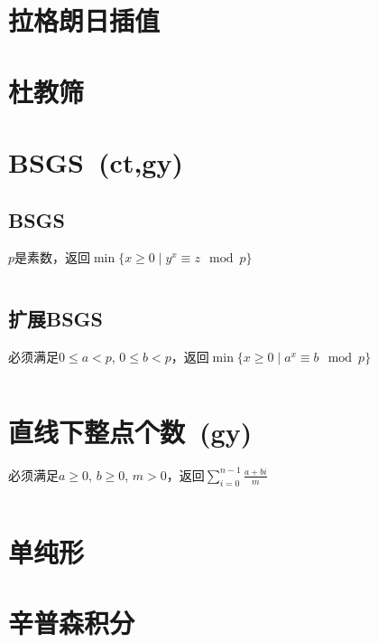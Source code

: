 \section{拉格朗日插值}
\section{杜教筛}
\section{BSGS\ \small(ct,gy)}
	\subsection{BSGS}
		$ p $是素数，返回$ \min\lbrace x \geq 0 \mid y^x \equiv z \mod p \rbrace $
		\inputminted{cpp}{Math/bsgs.cpp}
	\subsection{扩展BSGS}
		必须满足$ 0 \leq a < p $, $ 0 \leq b < p $，返回$ \min\lbrace x \geq 0 \mid a^x \equiv b \mod p\rbrace $
		\inputminted{cpp}{Math/ex_bsgs.cpp}
\section{直线下整点个数\ \small(gy)}
	必须满足$ a \geq 0 $, $ b \geq 0 $, $ m > 0 $，返回$ \sum\limits_{i=0}^{n-1} \frac{a + bi}{m} $
	\inputminted{cpp}{Math/points_below_line.cpp}
\section{单纯形}
\section{辛普森积分}
